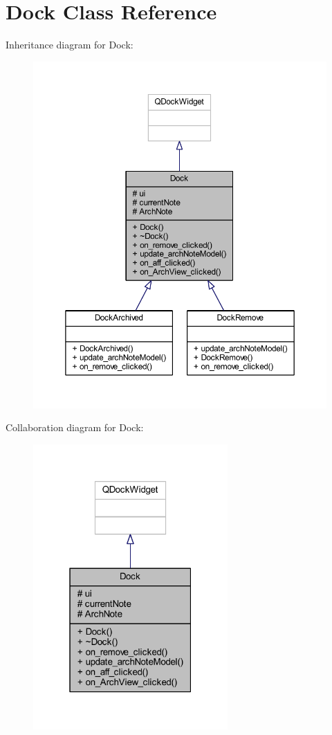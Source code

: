 \hypertarget{class_dock}{}\section{Dock Class Reference}
\label{class_dock}


Inheritance diagram for Dock\+:
\nopagebreak
\begin{figure}[H]
\begin{center}
\leavevmode
\includegraphics[width=350pt]{class_dock__inherit__graph}
\end{center}
\end{figure}


Collaboration diagram for Dock\+:
\nopagebreak
\begin{figure}[H]
\begin{center}
\leavevmode
\includegraphics[width=211pt]{class_dock__coll__graph}
\end{center}
\end{figure}

